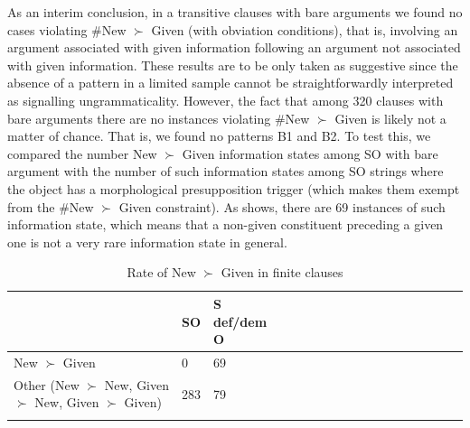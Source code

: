 \documentclass[output=paper,modfonts,nonflat]{langsci/langscibook}
\begin{document}
As an interim conclusion, in a transitive clauses with bare arguments we found no cases violating \#New $\succ$ Given (with obviation conditions), that is, involving an argument associated with given information following an argument not associated with given information. These results are to be only taken as suggestive since the absence of a pattern in a limited sample cannot be straightforwardly interpreted as signalling ungrammaticality. However, the fact that among 320 clauses with bare arguments there are no instances violating \#New $\succ$ Given is likely not a matter of chance. That is, we found no patterns B1 and B2. To test this, we compared the number New $\succ$ Given information states among SO with bare argument  with the number of such information states among SO strings where the object has a morphological presupposition trigger (which makes them exempt from the \#New $\succ$ Given constraint). As  shows, there are 69 instances of such information state, which means that a non-given constituent preceding a given one is not a very rare information state in general.




 \begin{table}
\centering
\begin{tabular}{lllllllllllllllll}
  \lsptoprule
 & SO & S def/dem O \\
 \midrule
New $\succ$ Given	&	0	& 69	\\
Other ({\scriptsize New $\succ$ New, Given $\succ$ New, Given $\succ$ Given}) 		&	283	&	79	\\
   \lspbottomrule
\end{tabular}
\caption{Rate of New $\succ$ Given in finite clauses}\label{table:orders3}
\end{table}
\end{document}

